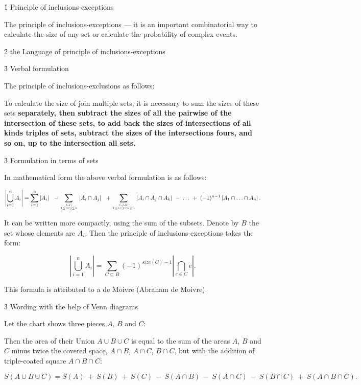 \h1{ Principle of inclusions-exceptions }

The principle of inclusions-exceptions --- it is an important combinatorial way to calculate the size of any set or calculate the probability of complex events.


\h2{ the Language of principle of inclusions-exceptions }


\h3{ Verbal formulation }

The principle of inclusions-exclusions as follows:

To calculate the size of join multiple sets, it is necessary to sum the sizes of these sets \bf{separately}, then subtract the sizes of all the \bf{pairwise} of the intersection of these sets, to add back the sizes of intersections of all kinds \bf{triples} of sets, subtract the sizes of the intersections \bf{fours}, and so on, up to the intersection \bf{all} sets.


\h3{ Formulation in terms of sets }

In mathematical form the above verbal formulation is as follows:

$$ \left| \bigcup_{i=1}^n A_i \right| = \sum_{i=1}^n \left| A_i \right| ~~ - \sum_{i,j : \atop 1 \le i < j \le n} \left| A_i \cap A_j \right| ~~ + \sum_{i,j,k : \atop 1 \le i < j < k \le n} \left| A_i \cap A_j \cap A_k \right| ~ - ~ \ldots ~ + ~ (-1)^{n-1} \left| A_1 \cap \ldots \cap A_n \right|. $$

It can be written more compactly, using the sum of the subsets. Denote by $B$ the set whose elements are $A_i$. Then the principle of inclusions-exceptions takes the form:

$$ \left| \bigcup_{i=1}^n A_i \right| = \sum_{C \subseteq B} (-1)^{size(C)-1} \left| \bigcap_{e \in C} e \right|. $$

This formula is attributed to a de Moivre (Abraham de Moivre).


\h3{ Wording with the help of Venn diagrams }

Let the chart shows three pieces $A$, $B$ and $C$:


Then the area of their Union $A \cup B \cup C$ is equal to the sum of the areas $A$, $B$ and $C$ minus twice the covered space, $A \cap B$, $A \cap C$, $B \cap C$, but with the addition of triple-coated square $A \cap B \cap C$:

$$ S(A \cup B \cup C) = S(A) ~ + ~ S(B) ~ + ~ S(C) ~ - ~ S(A \cap B) ~ - ~ S(A \cap C) ~ - ~ S(B \cap C) ~ + ~ S(A \cap B \cap C). $$


